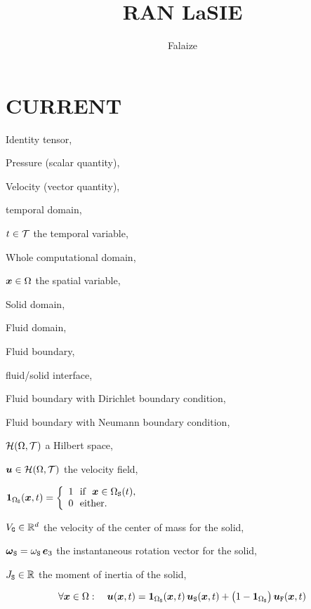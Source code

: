 \documentclass[10pt,a4paper]{article}
\author{Falaize}
\title{RAN LaSIE}
\begin{document}
%
%


\part{CURRENT}
\begin{description}
\item[$\Id$] Identity tensor,
%
\item[$p$] Pressure (scalar quantity),
%
\item[$\vu$] Velocity (vector quantity),
%
\item[$\sT\subset \RR$] temporal domain,
%
\item $t \in \mathcal T$ the temporal variable,
%
\item[$\dom\subset \RR ^d$] Whole computational domain,
%
\item $\boldsymbol{x} \in \Omega$ the spatial variable,
%
\item[$\doms(t) \subset \Omega$] Solid domain,
%
\item[$\domf(t) = \dom \setminus \doms(t)$] Fluid domain,
%
\item[$\bou(t)$] Fluid boundary,
%
\item[$\boui(t)\subset \bou$] fluid/solid interface,
%
\item[$\boud\subseteq \big(\bou\setminus \boui(t)\big)$] Fluid boundary with Dirichlet boundary condition,
%
\item[$\boun \subseteq \big(\bou \setminus \boui(t)\big)$] Fluid boundary with Neumann boundary condition,
%
\item $\mathcal H(\Omega, \mathcal T)$ a Hilbert space,
%
\item $\boldsymbol{u} \in \mathcal H(\Omega, \mathcal T)$ the velocity field,
%
\item $\boldsymbol 1_{\Omega_{\mathtt{S}}}(\boldsymbol{x}, t)=\left\{\begin{array}{l}
1 \mbox{~~if~~} \boldsymbol{x} \in \Omega_{\mathtt{S}}(t), \\
0 \mbox{~~either}.
\end{array} \right.$
%
\item $V_{\mathtt{G}}\in\mathbb{R}^d$ the velocity of the center of mass for the solid,
%
\item $\boldsymbol{\omega}_{{\mathtt{S}}} = \omega_{{\mathtt{S}}}\,\boldsymbol{e}_3 $ the instantaneous rotation vector for the solid,
%
\item $J_{\mathtt{S}} \in \mathbb{R}$ the moment of inertia of the solid,
%
%
\end{description}
%
$$\forall \boldsymbol{x} \in \Omega: \quad \boldsymbol{u}(\boldsymbol{x}, t) = \boldsymbol 1_{\Omega_{\mathtt{S}}}(\boldsymbol{x}, t)\, \boldsymbol{u}_{\mathtt{S}}(\boldsymbol{x}, t) + \big(1-\boldsymbol 1_{\Omega_{\mathtt{S}}} \big)\,\boldsymbol{u}_{\mathtt{F}}(\boldsymbol{x}, t)$$
%
\end{document}
